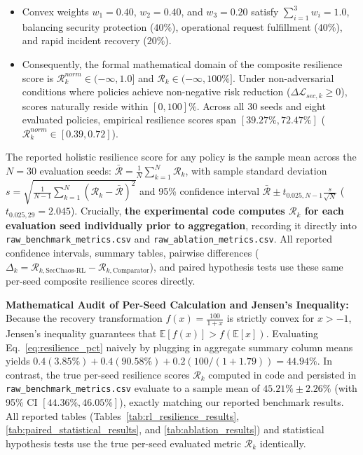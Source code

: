 \documentclass[11pt,a4paper]{article}
\begin{document}
\begin{enumerate}
\begin{itemize}
        \item Convex weights $w_1 = 0.40$, $w_2 = 0.40$, and $w_3 = 0.20$ satisfy $\sum_{i=1}^3 w_i = 1.0$, balancing security protection ($40\%$), operational request fulfillment ($40\%$), and rapid incident recovery ($20\%$).
        \item Consequently, the formal mathematical domain of the composite resilience score is $\mathcal{R}_k^{norm} \in (-\infty, 1.0]$ and $\mathcal{R}_k \in (-\infty, 100\%]$. Under non-adversarial conditions where policies achieve non-negative risk reduction ($\Delta \mathcal{L}_{sec, k} \ge 0$), scores naturally reside within $[0, 100]\%$. Across all 30 seeds and eight evaluated policies, empirical resilience scores span $[39.27\%, 72.47\%]$ ($\mathcal{R}_k^{norm} \in [0.39, 0.72]$).
    \end{itemize}
    The reported holistic resilience score for any policy is the sample mean across the $N=30$ evaluation seeds: $\bar{\mathcal{R}} = \frac{1}{N}\sum_{k=1}^N \mathcal{R}_k$, with sample standard deviation $s = \sqrt{\frac{1}{N-1}\sum_{k=1}^N (\mathcal{R}_k - \bar{\mathcal{R}})^2}$ and 95\% confidence interval $\bar{\mathcal{R}} \pm t_{0.025, N-1} \frac{s}{\sqrt{N}}$ ($t_{0.025, 29} = 2.045$). Crucially, \textbf{the experimental code computes $\mathcal{R}_k$ for each evaluation seed individually prior to aggregation}, recording it directly into \texttt{raw\_benchmark\_metrics.csv} and \texttt{raw\_ablation\_metrics.csv}. All reported confidence intervals, summary tables, pairwise differences ($\Delta_k = \mathcal{R}_{k, \text{SecChaos-RL}} - \mathcal{R}_{k, \text{Comparator}}$), and paired hypothesis tests use these same per-seed composite resilience scores directly.
    
    \textbf{Mathematical Audit of Per-Seed Calculation and Jensen's Inequality:} Because the recovery transformation $f(x) = \frac{100}{1+x}$ is strictly convex for $x > -1$, Jensen's inequality guarantees that $\mathbb{E}[f(x)] > f(\mathbb{E}[x])$. Evaluating Eq.~\eqref{eq:resilience_pct} naively by plugging in aggregate summary column means yields $0.4(3.85\%) + 0.4(90.58\%) + 0.2(100 / (1 + 1.79)) = 44.94\%$. In contrast, the true per-seed resilience scores $\mathcal{R}_k$ computed in code and persisted in \texttt{raw\_benchmark\_metrics.csv} evaluate to a sample mean of $\mathbf{45.21\% \pm 2.26\%}$ (with 95\% CI $[44.36\%, 46.05\%]$), exactly matching our reported benchmark results. All reported tables (Tables~\ref{tab:rl_resilience_results}, \ref{tab:paired_statistical_results}, and \ref{tab:ablation_results}) and statistical hypothesis tests use the true per-seed evaluated metric $\mathcal{R}_k$ identically.
\end{enumerate}
\end{document}
